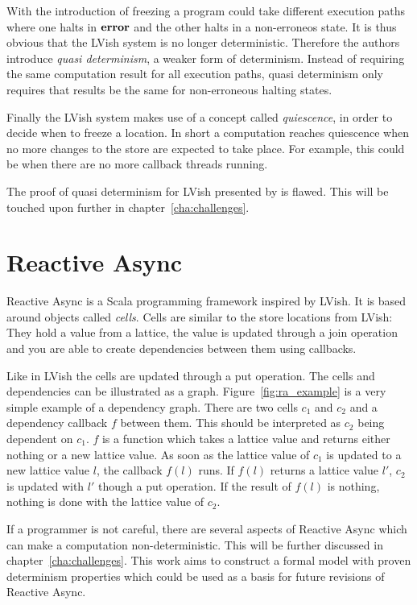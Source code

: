 With the introduction of freezing a program could take different execution
paths where one halts in $\mbox{{\bf error}}$ and the other halts in a non-erroneos state.
It is thus obvious that the LVish system is no longer deterministic. Therefore
the authors introduce \emph{quasi determinism}, a weaker form of
determinism. Instead of requiring the same computation result for all execution
paths, quasi determinism only requires that results be the same for
non-erroneous halting states.

Finally the LVish system makes use of a concept called \emph{quiescence}, in
order to decide when to freeze a location. In short a computation reaches
quiescence when no more changes to the store are expected to take place. For
example, this could be when there are no more callback threads running.

The proof of quasi determinism for LVish presented by
\textcite{kuper2014freezeTR} is flawed. This will be touched upon further in
chapter~\ref{cha:challenges}.


\section{Reactive Async}\label{sec:reactive_async}

Reactive Async is a Scala programming framework inspired by LVish. It is based
around objects called \emph{cells}.  Cells are similar to the store locations
from LVish: They hold a value from a lattice, the value is updated through a
join operation and you are able to create dependencies between them using
callbacks.

Like in LVish the cells are updated through a put operation.  The cells and
dependencies can be illustrated as a graph.  Figure~\ref{fig:ra_example} is a
very simple example of a dependency graph.  There are two cells $c_1$ and $c_2$
and a dependency callback $f$ between them. This should be interpreted as $c_2$
being dependent on $c_1$.  $f$ is a function which takes a lattice value and
returns either nothing or a new lattice value.  As soon as the lattice value of
$c_1$ is updated to a new lattice value $l$, the callback $f(l)$ runs. If $f(l)$
returns a lattice value $l'$, $c_2$ is updated with $l'$ though a put operation.
If the result of $f(l)$ is nothing, nothing is done with the lattice value of
$c_2$.

If a programmer is not careful, there are several aspects of Reactive Async
which can make a computation non-deterministic. This will be further discussed
in chapter~\ref{cha:challenges}. This work aims to construct a formal model with
proven determinism properties which could be used as a basis for future
revisions of Reactive Async.

